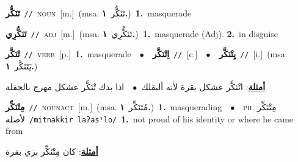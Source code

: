 \documentclass[10pt,a4paper,twoside]{article} %
\begin{document}
\begin{multicols}{2}
{\setlength\topsep{0pt}\textbf{\foreignlanguage{arabic}{تَنَكُّر}}\ {\color{gray}\texttt{//}\color{black}}\ \textsc{noun}\ [m.]\ \color{gray}(msa. \foreignlanguage{arabic}{تَنَكُّر}~\foreignlanguage{arabic}{\textbf{١.}})\color{black}\ \textbf{1.}~masquerade\ } \vspace{2mm}

{\setlength\topsep{0pt}\textbf{\foreignlanguage{arabic}{تَنَكُّرِي}}\ {\color{gray}\texttt{//}\color{black}}\ \textsc{adj}\ [m.]\ \color{gray}(msa. \foreignlanguage{arabic}{تَنَكُّرِي}~\foreignlanguage{arabic}{\textbf{١.}})\color{black}\ \textbf{1.}~masquerade (Adj).  \textbf{2.}~in disguise\ } \vspace{2mm}

{\setlength\topsep{0pt}\textbf{\foreignlanguage{arabic}{تْنَكَّر}}\ {\color{gray}\texttt{//}\color{black}}\ \textsc{verb}\ [p.]\ \textbf{1.}~masquerade\ \ $\bullet$\ \ \setlength\topsep{0pt}\textbf{\foreignlanguage{arabic}{اِتْنَكَّر}}\ {\color{gray}\texttt{//}\color{black}}\ [c.]\ \ $\bullet$\ \ \setlength\topsep{0pt}\textbf{\foreignlanguage{arabic}{يِتْنَكَّر}}\ {\color{gray}\texttt{//}\color{black}}\ [i.]\ \color{gray}(msa. \foreignlanguage{arabic}{يَتَنَكَّر}~\foreignlanguage{arabic}{\textbf{١.}})\color{black}\  \begin{flushright}\color{gray}\foreignlanguage{arabic}{\textbf{\underline{\foreignlanguage{arabic}{أمثلة}}}: اتْنَكَّر عشكل بقرة لأنه ألبقلك\ $\bullet$\ \  اذا بدك تْنَكَّر عشكل مهرج بالحفلة}\end{flushright}\color{black}} \vspace{2mm}

{\setlength\topsep{0pt}\textbf{\foreignlanguage{arabic}{مِتْنَكِّر}}\ {\color{gray}\texttt{//}\color{black}}\ \textsc{noun\textunderscore act}\ [m.]\ \color{gray}(msa. \foreignlanguage{arabic}{مُتَنَكِّر}~\foreignlanguage{arabic}{\textbf{١.}})\color{black}\ \textbf{1.}~masquerading\ \ $\bullet$\ \ \textsc{ph.} \color{gray} \foreignlanguage{arabic}{مِتْنَكِّر لأصله}\color{black}\ {\color{gray}\texttt{/{\sffamily mitnakkir laʔasˤlo}/}\color{black}}\ \textbf{1.}~not proud of his identity or where he came from\  \begin{flushright}\color{gray}\foreignlanguage{arabic}{\textbf{\underline{\foreignlanguage{arabic}{أمثلة}}}: كان مِتْنَكِّر بزي بقرة}\end{flushright}\color{black}} \vspace{2mm}


\end{multicols}
\end{document}
